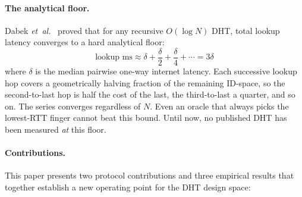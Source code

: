 \documentclass[conference]{IEEEtran}
\begin{document}
\paragraph{The analytical floor.} Dabek \emph{et~al.}~\cite{dabek2004designing}
proved that for any recursive $O(\log N)$ DHT, total lookup latency
converges to a hard analytical floor:
\begin{equation}
\text{lookup ms} \approx \delta + \frac{\delta}{2} + \frac{\delta}{4} + \cdots = 3\delta
\label{eq:dabek}
\end{equation}
where $\delta$ is the median pairwise one-way internet latency. Each
successive lookup hop covers a geometrically halving fraction of the
remaining ID-space, so the second-to-last hop is half the cost of the
last, the third-to-last a quarter, and so on. The series converges
regardless of $N$. Even an oracle that always picks the lowest-RTT
finger cannot beat this bound. Until now, no published DHT has been
measured \emph{at} this floor.

\paragraph{Contributions.}
This paper presents two protocol contributions and three empirical results
that together establish a new operating point for the DHT design space:
\end{document}
